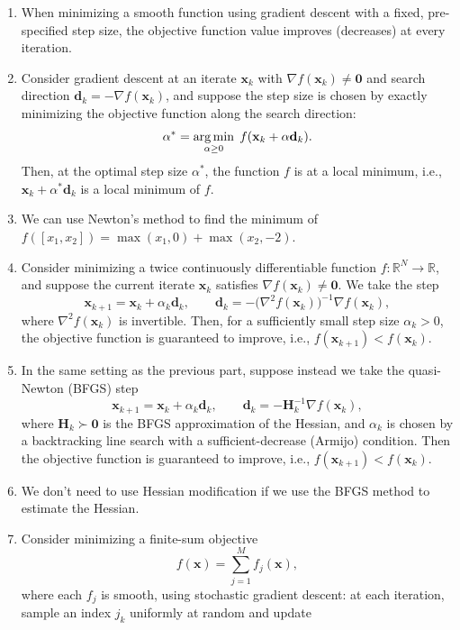 \begin{exercise}
\begin{enumerate}[label=(\alph*)]
        \item  When minimizing a smooth function using gradient descent with a fixed, pre-specified step size, the objective function value improves (decreases) at every iteration.
        \item  Consider gradient descent at an iterate $\mathbf{x}_k$ with $\nabla f(\mathbf{x}_k) \neq \mathbf{0}$ and search direction $\mathbf{d}_k = -\nabla f(\mathbf{x}_k)$, and suppose the step size is chosen by exactly minimizing the objective function along the search direction:
        \[
            \alpha^* = \operatorname*{arg\,min}_{\alpha \ge 0} \; f(\mathbf{x}_k + \alpha \mathbf{d}_k).
        \]
        Then, at the optimal step size $\alpha^*$, the function $f$ is at a local minimum, i.e., $\mathbf{x}_k + \alpha^* \mathbf{d}_k$ is a local minimum of $f$.
        \item We can use Newton's method to find the minimum of $f([x_1, x_2]) = \max(x_1, 0) + \max(x_2, -2)$.
        \item  Consider minimizing a twice continuously differentiable function $f: \mathbb{R}^N \to \mathbb{R}$, and suppose the current iterate $\mathbf{x}_k$ satisfies $\nabla f(\mathbf{x}_k) \neq \mathbf{0}$. We take the step
        \[
            \mathbf{x}_{k+1} = \mathbf{x}_k + \alpha_k \mathbf{d}_k, \qquad \mathbf{d}_k = -\big(\nabla^2 f(\mathbf{x}_k)\big)^{-1} \nabla f(\mathbf{x}_k),
        \]
        where $\nabla^2 f(\mathbf{x}_k)$ is invertible. Then, for a sufficiently small step size $\alpha_k > 0$, the objective function is guaranteed to improve, i.e., $f(\mathbf{x}_{k+1}) < f(\mathbf{x}_k)$.
        \item  In the same setting as the previous part, suppose instead we take the quasi-Newton (BFGS) step
        \[
            \mathbf{x}_{k+1} = \mathbf{x}_k + \alpha_k \mathbf{d}_k, \qquad \mathbf{d}_k = -\mathbf{H}_k^{-1} \nabla f(\mathbf{x}_k),
        \]
        where $\mathbf{H}_k \succ \mathbf{0}$ is the BFGS approximation of the Hessian, and $\alpha_k$ is chosen by a backtracking line search with a sufficient-decrease (Armijo) condition. Then the objective function is guaranteed to improve, i.e., $f(\mathbf{x}_{k+1}) < f(\mathbf{x}_k)$.
        \item We don't need to use Hessian modification if we use the BFGS method to estimate the Hessian.
        \item  Consider minimizing a finite-sum objective
        \[
            f(\mathbf{x}) = \sum_{j=1}^{M} f_j(\mathbf{x}),
        \]
        where each $f_j$ is smooth, using stochastic gradient descent: at each iteration, sample an index $j_k$ uniformly at random and update

\end{enumerate}
\end{exercise}
